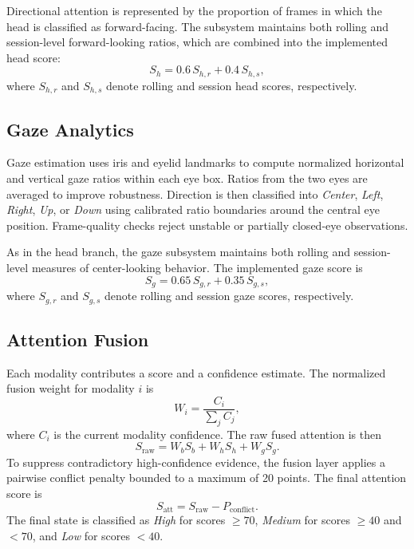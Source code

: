 \documentclass[conference]{IEEEtran}
\begin{document}
Directional attention is represented by the proportion of frames in which the head is classified as forward-facing. The subsystem maintains both rolling and session-level forward-looking ratios, which are combined into the implemented head score:
\begin{equation}
S_h = 0.6\,S_{h,r} + 0.4\,S_{h,s},
\end{equation}
where $S_{h,r}$ and $S_{h,s}$ denote rolling and session head scores, respectively.

\subsection{Gaze Analytics}
Gaze estimation uses iris and eyelid landmarks to compute normalized horizontal and vertical gaze ratios within each eye box. Ratios from the two eyes are averaged to improve robustness. Direction is then classified into \textit{Center}, \textit{Left}, \textit{Right}, \textit{Up}, or \textit{Down} using calibrated ratio boundaries around the central eye position. Frame-quality checks reject unstable or partially closed-eye observations.

As in the head branch, the gaze subsystem maintains both rolling and session-level measures of center-looking behavior. The implemented gaze score is
\begin{equation}
S_g = 0.65\,S_{g,r} + 0.35\,S_{g,s},
\end{equation}
where $S_{g,r}$ and $S_{g,s}$ denote rolling and session gaze scores, respectively.

\subsection{Attention Fusion}
Each modality contributes a score and a confidence estimate. The normalized fusion weight for modality $i$ is
\begin{equation}
W_i=\frac{C_i}{\sum_j C_j},
\end{equation}
where $C_i$ is the current modality confidence. The raw fused attention is then
\begin{equation}
S_{\mathrm{raw}} = W_b S_b + W_h S_h + W_g S_g.
\end{equation}
To suppress contradictory high-confidence evidence, the fusion layer applies a pairwise conflict penalty bounded to a maximum of 20 points. The final attention score is
\begin{equation}
S_{\mathrm{att}} = S_{\mathrm{raw}} - P_{\mathrm{conflict}}.
\end{equation}
The final state is classified as \textit{High} for scores $\geq 70$, \textit{Medium} for scores $\geq 40$ and $<70$, and \textit{Low} for scores $<40$.
\end{document}
